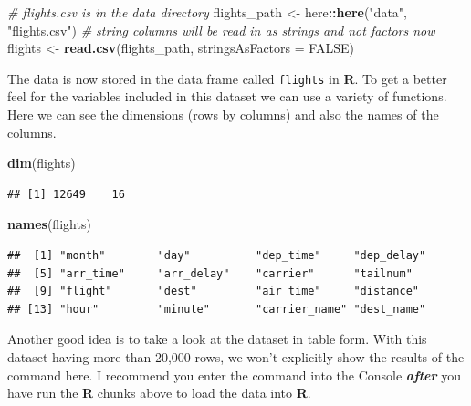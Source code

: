 \documentclass[12pt,twoside]{book}
\newenvironment{Shaded}{\begin{snugshade}}{\end{snugshade}}
\newcommand{\AttributeTok}[1]{\textcolor[rgb]{0.13,0.29,0.53}{#1}}
\newcommand{\CommentTok}[1]{\textcolor[rgb]{0.56,0.35,0.01}{\textit{#1}}}
\newcommand{\ConstantTok}[1]{\textcolor[rgb]{0.56,0.35,0.01}{#1}}
\newcommand{\FunctionTok}[1]{\textcolor[rgb]{0.13,0.29,0.53}{\textbf{#1}}}
\newcommand{\NormalTok}[1]{#1}
\newcommand{\OtherTok}[1]{\textcolor[rgb]{0.56,0.35,0.01}{#1}}
\newcommand{\SpecialCharTok}[1]{\textcolor[rgb]{0.81,0.36,0.00}{\textbf{#1}}}
\newcommand{\StringTok}[1]{\textcolor[rgb]{0.31,0.60,0.02}{#1}}
\begin{document}
\begin{Shaded}
\begin{Highlighting}[]
\CommentTok{\# flights.csv is in the data directory}
\NormalTok{flights\_path }\OtherTok{\textless{}{-}}\NormalTok{ here}\SpecialCharTok{::}\FunctionTok{here}\NormalTok{(}\StringTok{"data"}\NormalTok{, }\StringTok{"flights.csv"}\NormalTok{)}
\CommentTok{\# string columns will be read in as strings and not factors now}
\NormalTok{flights }\OtherTok{\textless{}{-}} \FunctionTok{read.csv}\NormalTok{(flights\_path, }\AttributeTok{stringsAsFactors =} \ConstantTok{FALSE}\NormalTok{)}
\end{Highlighting}
\end{Shaded}

The data is now stored in the data frame called \texttt{flights} in \textbf{R}. To get a better feel for the variables included in this dataset we can use a variety of functions. Here we can see the dimensions (rows by columns) and also the names of the columns.

\begin{Shaded}
\begin{Highlighting}[]
\FunctionTok{dim}\NormalTok{(flights)}
\end{Highlighting}
\end{Shaded}

\begin{verbatim}
## [1] 12649    16
\end{verbatim}

\begin{Shaded}
\begin{Highlighting}[]
\FunctionTok{names}\NormalTok{(flights)}
\end{Highlighting}
\end{Shaded}

\begin{verbatim}
##  [1] "month"        "day"          "dep_time"     "dep_delay"   
##  [5] "arr_time"     "arr_delay"    "carrier"      "tailnum"     
##  [9] "flight"       "dest"         "air_time"     "distance"    
## [13] "hour"         "minute"       "carrier_name" "dest_name"
\end{verbatim}

Another good idea is to take a look at the dataset in table form. With this dataset having more than 20,000 rows, we won't explicitly show the results of the command here. I recommend you enter the command into the Console \textbf{\emph{after}} you have run the \textbf{R} chunks above to load the data into \textbf{R}.
\end{document}
